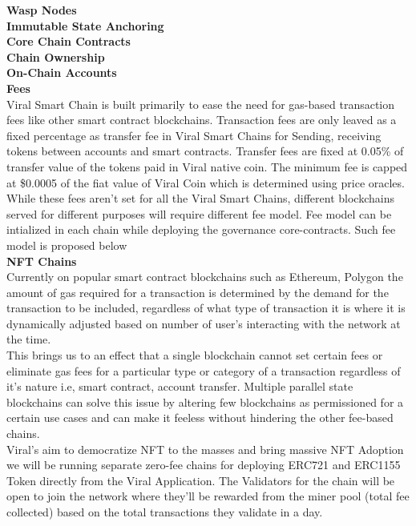 \documentclass[conference]{IEEEtran}
\begin{document}
\textbf{Wasp Nodes}\\

\textbf{Immutable State Anchoring}\\

\textbf{Core Chain Contracts}\\

\textbf{Chain Ownership}\\


\textbf{On-Chain Accounts}\\





\textbf{Fees}\\

Viral Smart Chain is built primarily to ease the need for gas-based transaction fees like other smart contract blockchains. Transaction fees are only leaved as a fixed percentage as transfer fee in Viral Smart Chains for Sending, receiving tokens between accounts and smart contracts. Transfer fees are fixed at 0.05\% of transfer value of the tokens paid in Viral native coin. The minimum fee is capped at \$0.0005 of the fiat value of Viral Coin which is determined using price oracles. While these fees aren't set for all the Viral Smart Chains, different blockchains served for different purposes will require different fee model. Fee model can be intialized in each chain while deploying the governance core-contracts. Such fee model is proposed below\\

\textbf{NFT Chains}\\

Currently on popular smart contract blockchains such as Ethereum, Polygon the amount of gas required for a transaction is determined by the demand for the transaction to be included, regardless of what type of transaction it is where it is dynamically adjusted based on number of user's interacting with the network at the time.\\

This brings us to an effect that a single blockchain cannot set certain fees or eliminate gas fees for a particular type or category of a transaction regardless of it's nature i.e, smart contract, account transfer. Multiple parallel state blockchains can solve this issue by altering few blockchains as permissioned for a certain use cases and can make it feeless without hindering the other fee-based chains.\\

Viral's aim to democratize NFT to the masses and bring massive NFT Adoption we will be running separate zero-fee chains for deploying ERC721 and ERC1155 Token directly from the Viral Application. The Validators for the chain will be open to join the network where they'll be rewarded from the miner pool (total fee collected) based on the total transactions they validate in a day.\\
\end{document}
